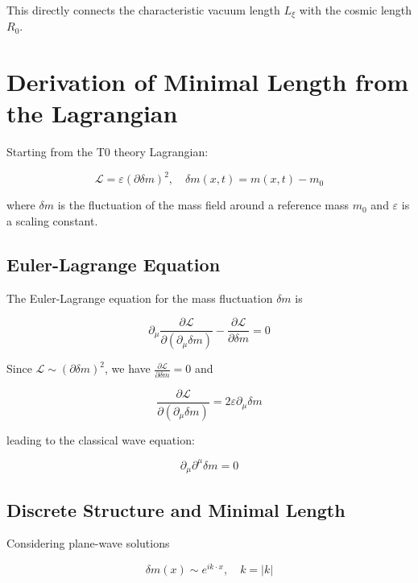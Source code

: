 \documentclass[12pt,a4paper]{article}
\numberwithin{equation}{section}
\begin{document}
	This directly connects the characteristic vacuum length $L_\xi$ with the cosmic length $R_0$.
	
	
	
	
	\section{Derivation of Minimal Length from the Lagrangian}
	
	Starting from the T0 theory Lagrangian:
	
	\begin{equation}
		\mathcal{L} = \varepsilon (\partial \delta m)^2, \quad \delta m(x,t) = m(x,t) - m_0
	\end{equation}
	
	where $\delta m$ is the fluctuation of the mass field around a reference mass $m_0$ and $\varepsilon$ is a scaling constant.
	
	\subsection{Euler-Lagrange Equation}
	
	The Euler-Lagrange equation for the mass fluctuation $\delta m$ is
	
	\begin{equation}
		\partial_\mu \frac{\partial \mathcal{L}}{\partial (\partial_\mu \delta m)} - \frac{\partial \mathcal{L}}{\partial \delta m} = 0
	\end{equation}
	
	Since $\mathcal{L} \sim (\partial \delta m)^2$, we have $\frac{\partial \mathcal{L}}{\partial \delta m} = 0$ and
	
	\begin{equation}
		\frac{\partial \mathcal{L}}{\partial (\partial_\mu \delta m)} = 2 \varepsilon \partial_\mu \delta m
	\end{equation}
	
	leading to the classical wave equation:
	
	\begin{equation}
		\partial_\mu \partial^\mu \delta m = 0
	\end{equation}
	
	\subsection{Discrete Structure and Minimal Length}
	
	Considering plane-wave solutions
	
	\begin{equation}
		\delta m(x) \sim e^{i k \cdot x}, \quad k = |k|
	\end{equation}
	
\end{document}
